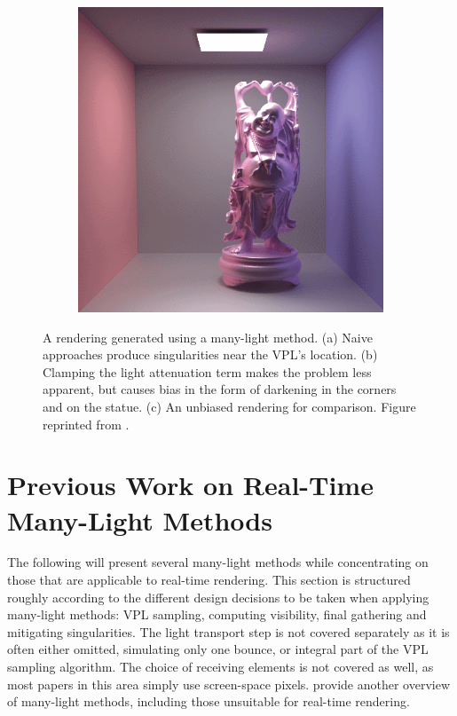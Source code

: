 \begin{figure}[htb]
\begin{subfigure}[b]{0.32\textwidth}
        \caption{}
    \end{subfigure}%
    \hfill
    \begin{subfigure}[b]{0.32\textwidth}
        \centering
        \includegraphics[width=1.0\linewidth]{graphics/clamping3-dachsbacher}%
        \caption{}
    \end{subfigure}%
    \caption{A rendering generated using a many-light method. (a) Naive approaches produce singularities near the VPL's location. (b) Clamping the light attenuation term makes the problem less apparent, but causes bias in the form of darkening in the corners and on the statue. (c) An unbiased rendering for comparison. Figure reprinted from \citet{Dachsbacher:2014:ManyLightsSTAR}.}
    \label{fig:introGI:clamping}%
\end{figure}%



\section{Previous Work on Real-Time Many-Light Methods}
\label{sec:intro:relatedWorkManyLight}

The following will present several many-light methods while concentrating on those that are applicable to real-time rendering. This section is structured roughly according to the different design decisions to be taken when applying many-light methods: VPL sampling, computing visibility, final gathering and mitigating singularities. The light transport step is not covered separately as it is often either omitted, simulating only one bounce, or integral part of the VPL sampling algorithm. The choice of receiving elements is not covered as well, as most papers in this area simply use screen-space pixels. \citet{Dachsbacher:2014:ManyLightsSTAR} provide another overview of many-light methods, including those unsuitable for real-time rendering.


